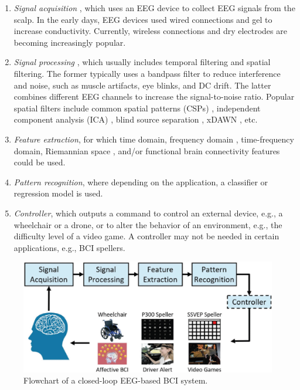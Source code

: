 \documentclass[journal,twocolumn]{IEEEtran}
\begin{document}
\begin{enumerate}
\item \emph{Signal acquisition} \cite{Liao2012}, which uses an EEG device to collect EEG signals from the scalp. In the early days, EEG devices used wired connections and gel to increase conductivity. Currently, wireless connections and dry electrodes are becoming increasingly popular.

\item \emph{Signal processing} \cite{Makeig2012}, which usually includes temporal filtering and spatial filtering. The former typically uses a bandpass filter to reduce interference and noise, such as muscle artifacts, eye blinks, and DC drift. The latter combines different EEG channels to increase the signal-to-noise ratio. Popular spatial filters include common spatial patterns (CSPs) \cite{ramoser2000optimal}, independent component analysis (ICA) \cite{Makeig1996a}, blind source separation \cite{Jung2000}, xDAWN \cite{rivet2009xdawn}, etc.

\item \emph{Feature extraction}, for which time domain, frequency domain \cite{Wang2014b}, time-frequency domain, Riemannian space \cite{Yger2017}, and/or functional brain connectivity \cite{Wu2019} features could be used.

\item \emph{Pattern recognition}, where depending on the application, a classifier or regression model is used.

\item \emph{Controller}, which outputs a command to control an external device, e.g., a wheelchair or a drone, or to alter the behavior of an environment, e.g., the difficulty level of a video game. A controller may not be needed in certain applications, e.g., BCI spellers.
\end{enumerate}

\begin{figure}[htbp]  %
  \centering  %
  \includegraphics[width=\linewidth]{figures/fig1.eps}  %
  \caption{Flowchart of a closed-loop EEG-based BCI system.}  %
  \label{fig:bci_flowchart}  %
\end{figure}
\end{document}
